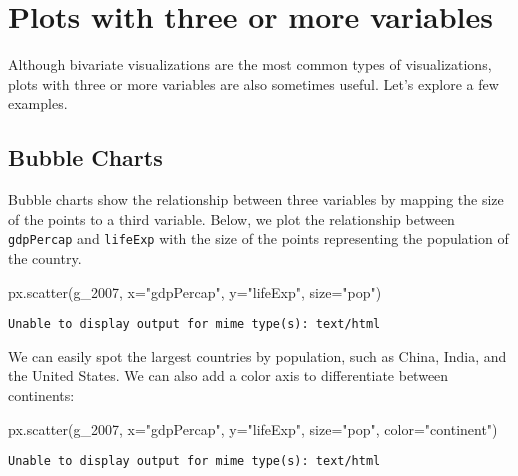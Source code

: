 \documentclass[
  letterpaper,
  DIV=11,
  numbers=noendperiod]{scrreprt}
\newenvironment{Shaded}{\begin{snugshade}}{\end{snugshade}}
\newcommand{\NormalTok}[1]{\textcolor[rgb]{0.00,0.23,0.31}{#1}}
\newcommand{\OperatorTok}[1]{\textcolor[rgb]{0.37,0.37,0.37}{#1}}
\newcommand{\StringTok}[1]{\textcolor[rgb]{0.13,0.47,0.30}{#1}}
\begin{document}
\section{Plots with three or more
variables}\label{plots-with-three-or-more-variables}

Although bivariate visualizations are the most common types of
visualizations, plots with three or more variables are also sometimes
useful. Let's explore a few examples.

\subsection{Bubble Charts}\label{bubble-charts}

Bubble charts show the relationship between three variables by mapping
the size of the points to a third variable. Below, we plot the
relationship between \texttt{gdpPercap} and \texttt{lifeExp} with the
size of the points representing the population of the country.

\begin{Shaded}
\begin{Highlighting}[]
\NormalTok{px.scatter(g\_2007, x}\OperatorTok{=}\StringTok{"gdpPercap"}\NormalTok{, y}\OperatorTok{=}\StringTok{"lifeExp"}\NormalTok{, size}\OperatorTok{=}\StringTok{"pop"}\NormalTok{)}
\end{Highlighting}
\end{Shaded}

\begin{verbatim}
Unable to display output for mime type(s): text/html
\end{verbatim}

We can easily spot the largest countries by population, such as China,
India, and the United States. We can also add a color axis to
differentiate between continents:

\begin{Shaded}
\begin{Highlighting}[]
\NormalTok{px.scatter(g\_2007, x}\OperatorTok{=}\StringTok{"gdpPercap"}\NormalTok{, y}\OperatorTok{=}\StringTok{"lifeExp"}\NormalTok{, size}\OperatorTok{=}\StringTok{"pop"}\NormalTok{, color}\OperatorTok{=}\StringTok{"continent"}\NormalTok{)}
\end{Highlighting}
\end{Shaded}

\begin{verbatim}
Unable to display output for mime type(s): text/html
\end{verbatim}
\end{document}

